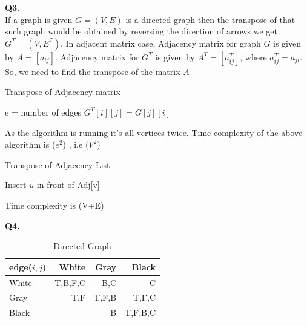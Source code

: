 \documentclass[11pt]{article}
\newcommand{\bigO}{\mathcal{O}}
\begin{document}
\vspace{5mm}
\hline
\vspace{5mm}
\textbf{Q3}.\\
If a graph is given $G = (V, E)$ is a directed graph then the transpose of that such graph would be obtained by reversing the direction of arrows we get $G^T = (V, E^T)$. In adjacent matrix case, Adjacency matrix for graph $G$ is given by $A = [a_{ij}]$. Adjacency matrix for $G^T$ is given by $A^T = [a^{T}_{ij}]$, where $a^{T}_{ij} = a_{ji}$. So, we need to find the transpose of the matrix $A$\\

\begin{algorithm}
\caption{Transpose of Adjacency matrix}\label{euclid}
\begin{algorithmic}
\State e = number of edges
\State $G^T[i][j] = G[j][i]$
\EndFor
\EndFor
\end{algorithmic}
\end{algorithm}

As the algorithm is running it's all vertices twice. Time complexity of the above algorithm is \bigO($e^2$) , i.e \bigO($V^2$)\\

\begin{algorithm}
\caption{Transpose of Adjacency List}\label{euclid}
\begin{algorithmic}
\State Insert $u$ in front of Adj[v]
\EndFor
\EndFor
\end{algorithmic}
\end{algorithm}

Time complexity is \bigO(V+E)

\vspace{5mm}
\hline
\vspace{5mm}
\textbf{Q4.}\\
 \begin{table}[htp]
\begin{tabular}{|l|r|r|r|}
\toprule
edge($i,j$) &  White &  Gray &  Black \\
\midrule
White    &       T,B,F,C &  B,C &     C \\
Gray &       T,F &  T,F,B &     T,F,C  \\
Black       &        &  B &     T,F,B,C \\
\bottomrule
\end{tabular}
\caption {Directed Graph}
\end{table} 
\end{document}
